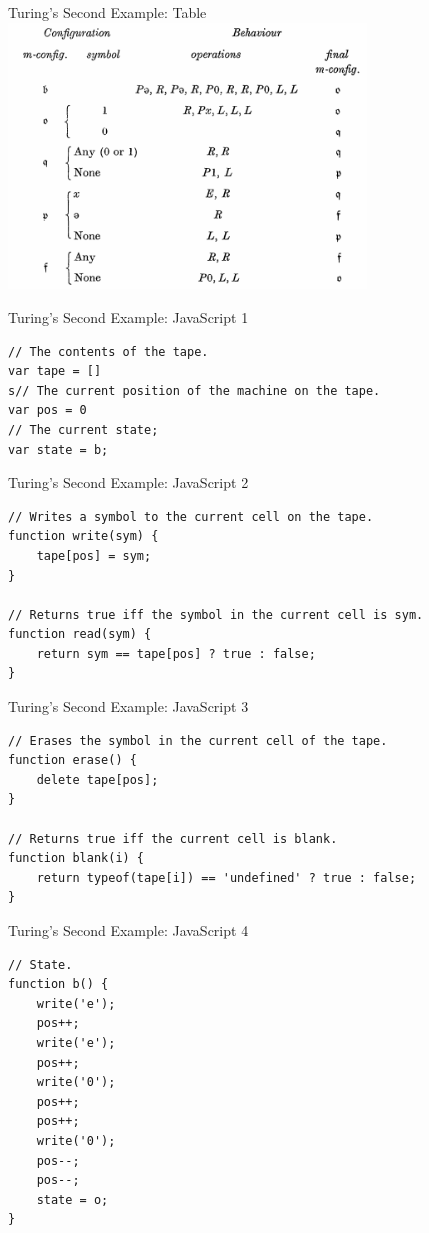 \begin{frame}{Turing's Second Example: Table}
  \includegraphics[width=9.5cm]{img/turing-table-2.png}
\end{frame}

\begin{frame}[fragile]{Turing's Second Example: JavaScript 1}
\begin{verbatim}
// The contents of the tape.
var tape = []
s// The current position of the machine on the tape.
var pos = 0
// The current state;
var state = b;
\end{verbatim}
\end{frame}

\begin{frame}[fragile]{Turing's Second Example: JavaScript 2}
\begin{verbatim}
// Writes a symbol to the current cell on the tape.
function write(sym) {
	tape[pos] = sym;
}

// Returns true iff the symbol in the current cell is sym.
function read(sym) {
	return sym == tape[pos] ? true : false;
}
\end{verbatim}
\end{frame}

\begin{frame}[fragile]{Turing's Second Example: JavaScript 3}
\begin{verbatim}
// Erases the symbol in the current cell of the tape.
function erase() {
	delete tape[pos];
}

// Returns true iff the current cell is blank.
function blank(i) {
	return typeof(tape[i]) == 'undefined' ? true : false;
}
\end{verbatim}
\end{frame}

\begin{frame}[fragile]{Turing's Second Example: JavaScript 4}
\begin{verbatim}
// State.
function b() {
	write('e');
	pos++;
	write('e');
	pos++;
	write('0');
	pos++;
	pos++;
	write('0');
	pos--;
	pos--;
	state = o;
}
\end{verbatim}
\end{frame}

